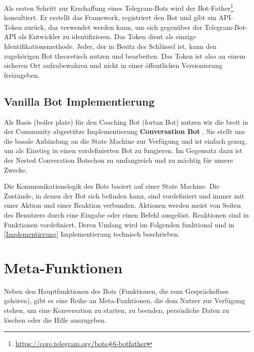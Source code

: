             Als ersten Schritt zur Erschaffung eines Telegram-Bots wird der Bot-Father\footnote{\url{https://core.telegram.org/bots\#6-botfather}} konsultiert.  Er erstellt das Framework, registriert den Bot und gibt ein API-Token zurück, das verwendet werden kann, um sich gegenüber der Telegram-Bot-API als Entwickler zu identifizieren. \cite{telegramAPI} Das Token dient als einzige Identifikationsmethode. Jeder, der in Besitz des Schlüssel ist, kann den zugehörigen Bot theoretisch nutzen und bearbeiten. Das Token ist also an einem sicheren Ort aufzubewahren und nicht in einer öffentlichen Versionierung freizugeben.

        \subsection{Vanilla Bot Implementierung}
            Als Basis (boiler plate) für den Coaching Bot (fortan \glqq Bot\grqq) nutzen wir die breit in der Community abgestütze Implementierung \textbf{Conversation Bot} \cite{conversationBot}. Sie stellt uns die basale Anbindung an die State Machine zur Verfügung und ist einfach genug, um als Einstieg in einen vordefinierten Bot zu fungieren. Im Gegensatz dazu ist der \glqq Nested Converation Bot\grqq  schon zu umfangreich und zu mächtig für unsere Zwecke.

            Die Kommunikationslogik des Bots basiert auf einer State Machine. Die Zustände, in denen der Bot sich befinden kann, sind vordefiniert und immer mit einer Aktion und einer Reaktion verbunden. Aktionen werden meist von Seiten des Benutzers durch eine Eingabe oder einen Befehl ausgelöst. Reaktionen sind in Funktionen vordefiniert. Deren Umfang wird im Folgenden funktional und in \ref{Implementierung} Implementierung technisch beschrieben.

    
    \section{Meta-Funktionen}
        Neben den Hauptfunktionen des Bots (Funktionen, die zum Gesprächsfluss gehören), gibt es eine Reihe an Meta-Funktionen, die dem Nutzer zur Verfügung stehen, um eine Konversation zu starten, zu beenden, persönliche Daten zu löschen oder die Hilfe auszugeben.

